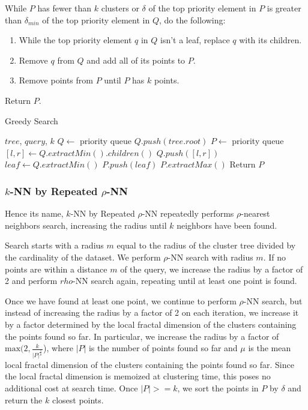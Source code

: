 While $P$ has fewer than $k$ clusters or $\delta$ of the top priority element in $P$ is greater 
than $\delta_{min}$ of the top priority element in $Q$, do the following:
\begin{enumerate}
\item While the top priority element $q$ in $Q$ isn't a leaf, replace $q$ with its children.
\item Remove $q$ from $Q$ and add all of its points to $P$. 
\item Remove points from $P$ until $P$ has $k$ points. 
\end{enumerate}

Return $P$. 

\begin{algorithm} 
\caption{Greedy Search} 
\label{alg:greedy_search} 
\begin{algorithmic}[1]
    \REQUIRE $tree$, $query$, $k$
    \STATE $Q \leftarrow$ priority queue
    \STATE $Q.push(tree.root)$
    \STATE $P \leftarrow$ priority queue
            \STATE $[l, r] \leftarrow Q.extractMin().children()$
            \STATE $Q.push([l, r])$
        \ENDWHILE
        \STATE $leaf \leftarrow Q.extractMin()$
        \STATE $P.push(leaf)$
            \STATE $P.extractMax()$
        \ENDWHILE
    \ENDWHILE
    \STATE Return $P$
\end{algorithmic}
\end{algorithm}


\subsubsection{$k$-NN by Repeated $\rho$-NN}
\label{subsubsec:methods:knn-search:repeated-rnn}

Hence its name, $k$-NN by Repeated $\rho$-NN repeatedly performs 
$\rho$-nearest neighbors search, increasing the radius until $k$ neighbors
have been found.

Search starts with a radius $m$ equal to the radius of the cluster tree divided by
the cardinality of the dataset. We perform $\rho$-NN search with radius $m$. 
If no points are within a distance $m$ of the query, we increase the radius by a factor of 
2 and perform $rho$-NN search again, repeating until at least one point is found.

Once we have found at least one point, we continue to perform $\rho$-NN search, but instead of 
increasing the radius by a factor of 2 on each iteration, we increase it by a factor determined 
by the local fractal dimension of the clusters containing the points found so far. In particular, 
we increase the radius by a factor of $\text{max}(2, \frac{k}{|P|^{\frac{1}{\mu}}}$), where $|P|$ is the number of 
points found so far and $\mu$ is the mean local fractal dimension of the clusters containing the points found so far.
Since the local fractal dimension is memoized at clustering time, this poses no additional cost at search time.
Once $|P| >= k$, we sort the points in $P$ by $\delta$ and return the $k$ closest points.


